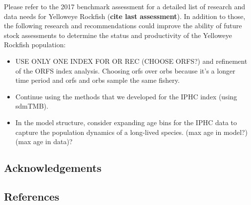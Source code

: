 \documentclass[
]{scrartcl}
\providecommand{\tightlist}{%
  \setlength{\itemsep}{0pt}\setlength{\parskip}{0pt}}\usepackage{longtable,booktabs,array}
\begin{document}
Please refer to the 2017 benchmark assessment for a detailed list of
research and data needs for Yelloweye Rockfish (\textbf{cite last
assessment}). In addition to those, the following research and
recommendations could improve the ability of future stock assessments to
determine the status and productivity of the Yelloweye Rockfish
population:

\begin{itemize}
\tightlist
\item
  USE ONLY ONE INDEX FOR OR REC (CHOOSE ORFS?) and refinement of the
  ORFS index analysis. Choosing orfs over orbs because it's a longer
  time period and orfs and orbs sample the same fishery.
\item
  Continue using the methods that we developed for the IPHC index (using
  sdmTMB).
\item
  In the model structure, consider expanding age bins for the IPHC data
  to capture the population dynamics of a long-lived species. (max age
  in model?) (max age in data)?
\end{itemize}

\newpage{}

\subsection{Acknowledgements}\label{sec-acknowledgements}

\newpage{}

\subsection{References}\label{references}
\end{document}
